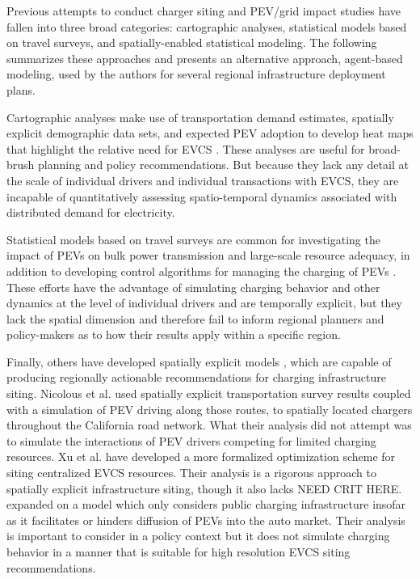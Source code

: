 \documentclass[journal]{IEEEtran}
\begin{document}
Previous attempts to conduct charger siting and PEV/grid impact studies have fallen into three broad categories: cartographic analyses, statistical models based on travel surveys, and spatially-enabled statistical modeling. The following summarizes these approaches and presents an alternative approach, agent-based modeling, used by the authors for several regional infrastructure deployment plans.

Cartographic analyses make use of transportation demand estimates, spatially explicit demographic data sets, and expected PEV adoption to develop heat maps that highlight the relative need for EVCS \cite{international_bay_2012} \cite{innovation_southern_2012} \cite{houston_electric_2011} \cite{melaina_california_2014} \cite{institute_plug-electric_2011}. These analyses are useful for broad-brush planning and policy recommendations. But because they lack any detail at the scale of individual drivers and individual transactions with EVCS, they are incapable of quantitatively assessing spatio-temporal dynamics associated with distributed demand for electricity.

Statistical models based on travel surveys are common for investigating the impact of PEVs on bulk power transmission and large-scale resource adequacy, in addition to developing control algorithms for managing the charging of PEVs \cite{jansen_emissions_2010} \cite{zhang_evaluation_2013} \cite{zhang_coordinating_2014} \cite{xu_optimal_2013}. These efforts have the advantage of simulating charging behavior and other dynamics at the level of individual drivers and are temporally explicit, but they lack the spatial dimension and therefore fail to inform regional planners and policy-makers as to how their results apply within a specific region.

Finally, others have developed spatially explicit models \cite{nicholas_california_2013} \cite{kearney_electric_2009} \cite{xu_optimal_2013}, which are capable of producing regionally actionable recommendations for charging infrastructure siting. Nicolous et al. used spatially explicit transportation survey results coupled with a simulation of PEV driving along those routes, to spatially located chargers throughout the California road network. What their analysis did not attempt was to simulate the interactions of PEV drivers competing for limited charging resources. Xu et al. have developed a more formalized optimization scheme for siting centralized EVCS resources. Their analysis is a rigorous approach to spatially explicit infrastructure siting, though it also lacks NEED CRIT HERE. \cite{kearney_electric_2009} expanded on a model \cite{struben_transition_2007} which only considers public charging infrastructure insofar as it facilitates or hinders diffusion of PEVs into the auto market. Their analysis is important to consider in a policy context but it does not simulate charging behavior in a manner that is suitable for high resolution EVCS siting recommendations.
\end{document}
